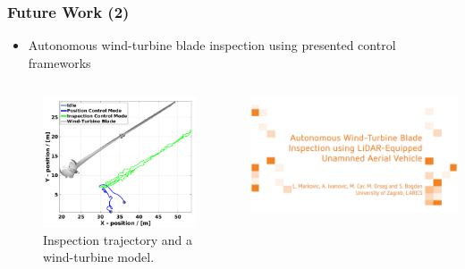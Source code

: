 \begin{frame}
	\frametitle{Future Work (2)}
	\begin{itemize}
		\item Autonomous wind-turbine blade inspection using presented control frameworks
	\end{itemize}
	\begin{columns}
		\begin{column}{0.5\textwidth}\centering
			\begin{figure}[H]
				\centering
				\includegraphics[width=0.8\columnwidth]{figures/uav_position_experiment_resized.pdf}
				\caption{Inspection trajectory and a wind-turbine model.}
			\end{figure}
		\end{column}
		\begin{column}{0.5\textwidth}\centering
			\href{video_presentation.mp4}{\includegraphics[width=\columnwidth]{figures/title_screen.png}}
		\end{column}
	\end{columns}
\end{frame}



